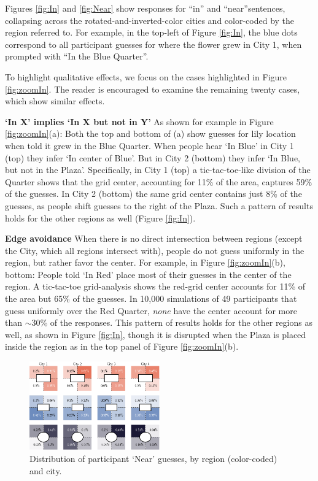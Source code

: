 \documentclass[10pt,letterpaper]{article}
\begin{document}
Figures \ref{fig:In} and \ref{fig:Near} show responses for ``in'' and ``near''sentences, collapsing across the rotated-and-inverted-color cities and color-coded by the region referred to. For example, in the top-left of Figure \ref{fig:In}, the blue dots correspond to all participant guesses for where the flower grew in City 1, when prompted with ``In the Blue Quarter''. 

To highlight qualitative effects, we focus on the cases highlighted in Figure \ref{fig:zoomIn}. The reader is encouraged to examine the remaining twenty cases, which show similar effects. 

\textbf{`In X' implies `In X but not in Y'} As shown for example in Figure \ref{fig:zoomIn}(a): Both the top and bottom of (a) show guesses for lily location when told it grew in the Blue Quarter. When people hear `In Blue' in City 1 (top) they infer `In center of Blue'. But in City 2 (bottom) they infer `In Blue, but not in the Plaza'. Specifically, in City 1 (top) a tic-tac-toe-like division of the Quarter shows that the grid center, accounting for 11\% of the area, captures 59\% of the guesses. In City 2 (bottom) the same grid center contains just 8\% of the guesses, as people shift guesses to the right of the Plaza. Such a pattern of results holds for the other regions as well (Figure \ref{fig:In}). 

\textbf{Edge avoidance} When there is no direct intersection between regions (except the City, which all regions intersect with), people do not guess uniformly in the region, but rather favor the center. For example, in Figure \ref{fig:zoomIn}(b), bottom: People told `In Red' place most of their guesses in the center of the region. A tic-tac-toe grid-analysis shows the red-grid center accounts for 11\% of the area but 65\% of the guesses. In 10,000 simulations of 49 participants that guess uniformly over the Red Quarter,  \textit{none} have the center account for more than $\sim$30\% of the responses. This pattern of results holds for the other regions as well, as shown in Figure \ref{fig:In}, though it is disrupted when the Plaza is placed inside the region as in the top panel of Figure \ref{fig:zoomIn}(b). 

\begin{figure}[!b]
\center
\includegraphics[width=0.5\textwidth]{figures/nearByQuad.png}
\caption{Distribution of participant `Near' guesses, by region (color-coded) and city.}
\label{fig:nearByQuad}
\end{figure}
\end{document}
